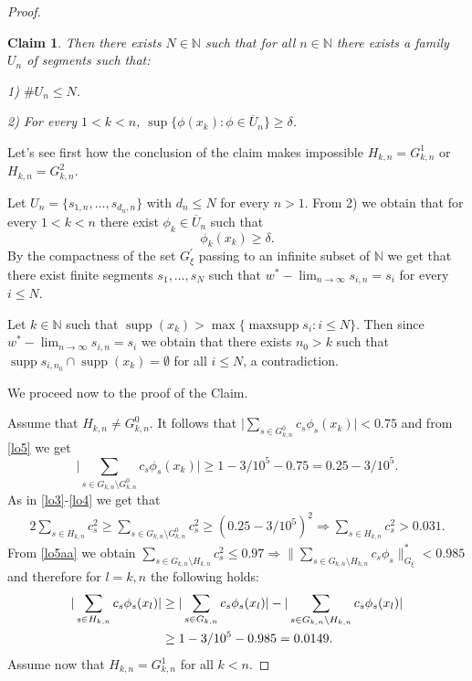 \documentclass[a4paper]{amsart}
\theoremstyle{plain}
\newtheorem*{claim}{Claim}
\newcommand{\N}{\mathbb{N}}
\DeclareMathOperator{\maxsupp}{maxsupp}
\DeclareMathOperator{\supp}{supp}
\begin{document}
\begin{proof}
\begin{claim}
Then there exists $N\in\N$ such that for all $n\in\N$ there exists a family $U_{n}$ of segments such that:

1) $\# U_{n}\leq N$.

2) For every $1<k<n$, $\sup\{\phi(x_k):\phi\in \overline{U}_{n}\}\geq\delta$.
\end{claim}
Let's see first how the conclusion of the claim makes impossible  $H_{k,n}=G_{k,n}^{1}$
or $H_{k,n}=G_{k,n}^{2}$.


Let $U_{n}=\{s_{1,n},\dots,s_{d_n,n}\}$ with $d_n\leq N$ for every $n>1$. From 2) we
obtain that for every $1<k<n$ there exist $\phi_{k}\in \overline{U}_{n}$   such that
$$
\phi_{k}(x_k)\geq \delta.
$$
By the compactness of the set $G_{\xi}^{\prime}$ passing to an
infinite subset of $\N$ we get that there exist finite segments
$s_{1},\dots,s_{N}$ such that
$w^{*}-\lim_{n\to\infty}s_{i,n}=s_{i}$ for every $i\leq N$.

Let $k\in\N$ such that $\supp (x_k)>\max\{\maxsupp s_{i}: i\leq N\}$.  Then since
$w^{*}-\lim_{n\to\infty}s_{i,n}=s_{i}$ we obtain that there exists  $n_0>k$ such that
$\supp s_{i,n_0}\cap\supp (x_k)=\emptyset$ for all $i\leq N$, a contradiction.

\medskip

We proceed now to the proof of the Claim.

Assume that $H_{k,n}\ne G_{k,n}^{0}$. It follows that  $\vert \sum_{s\in G_{k,n}^0}c_{s}\phi_{s}(x_k)\vert< 0.75$ and from  \eqref{lo5} we get
\begin{equation}
\vert \sum_{s\in G_{k,n}\setminus G_{k,n}^0}c_{s}\phi_{s}(x_k)\vert\geq 1-3/10^{5}-0.75=0.25-3/10^{5}.
\end{equation}
As in \eqref{lo3}-\eqref{lo4} we get that
\begin{align}
2\sum_{s\in H_{k,n}}c_{s}^{2}\geq
\sum_{s\in G_{k,n}\setminus G_{k,n}^{0}}c_{s}^{2}\geq
(0.25-3/10^{5})^2
\Rightarrow \sum_{s\in H_{k,n}}c_{s}^{2}>0.031.
\label{lo5aa}
\end{align}
From \eqref{lo5aa}  we obtain $\sum_{s\in G_{k,n}\setminus H_{k,n}}c_{s}^{2}\leq
0.97\Rightarrow\|\sum_{s\in G_{k,n}\setminus H_{k,n}}c_{s}\phi_{s}\|_{G_\xi}^*< 0.985
$
and therefore for $l=k,n$ the following holds:
\begin{align}\label{lo5c}
\vert \sum_{s\in H_{k,n}}c_{s}\phi_{s}(x_l)\vert&\geq
\vert \sum_{s\in G_{k,n}}c_{s}\phi_{s}(x_l)\vert
-\vert \sum_{s\in G_{k,n}\setminus H_{k,n}}c_{s}\phi_{s}(x_l)\vert
\\
&\geq
 1-3/10^{5}-0.985=0.0149.\notag
\end{align}
Assume now  that  $H_{k,n}=G^{1}_{k,n}$ for all $k<n$.


\end{proof}
\end{document}
